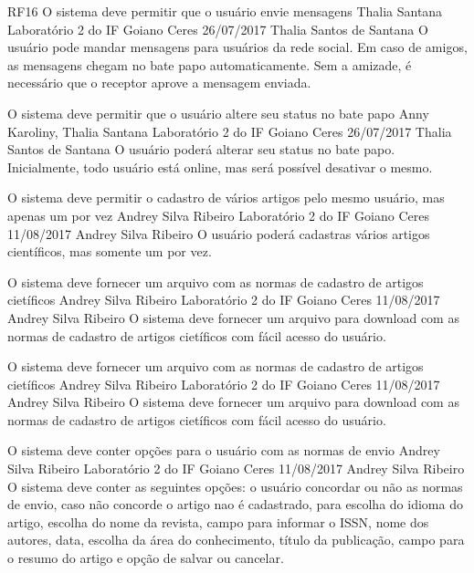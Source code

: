  \requisitoFuncional
 {RF16}
 {O sistema deve permitir que o  usuário envie mensagens}
 {Thalia Santana}
 {Laboratório 2 do IF Goiano Ceres}
 {26/07/2017}
 {Thalia Santos de Santana}
 {O usuário pode mandar mensagens para usuários da rede social. Em caso de amigos, as mensagens chegam no bate papo automaticamente. Sem a amizade, é necessário que o receptor aprove a mensagem enviada.
 }
 
 {O sistema deve permitir que o usuário altere seu status no bate papo}
 {Anny Karoliny, Thalia Santana}
 {Laboratório 2 do IF Goiano Ceres}
 {26/07/2017}
 {Thalia Santos de Santana}
 { O usuário poderá alterar seu status no bate papo. Inicialmente, todo usuário está online, mas será possível desativar o mesmo.
 }	
 
 {O sistema deve permitir o cadastro de vários artigos pelo mesmo usuário, mas apenas um por vez}
 {Andrey Silva Ribeiro}
 {Laboratório 2 do IF Goiano Ceres}
 {11/08/2017}
 {Andrey Silva Ribeiro}
 { O usuário poderá cadastras vários artigos científicos, mas somente um por vez.
 }
 
 {O sistema deve fornecer um arquivo com as normas de cadastro de artigos cietíficos}
 {Andrey Silva Ribeiro}
 {Laboratório 2 do IF Goiano Ceres}
 {11/08/2017}
 {Andrey Silva Ribeiro}
 { O sistema deve fornecer um arquivo para download com as normas de cadastro de artigos cietíficos com fácil acesso do usuário.
 }
 
 {O sistema deve fornecer um arquivo com as normas de cadastro de artigos cietíficos}
 {Andrey Silva Ribeiro}
 {Laboratório 2 do IF Goiano Ceres}
 {11/08/2017}
 {Andrey Silva Ribeiro}
 { O sistema deve fornecer um arquivo para download com as normas de cadastro de artigos cietíficos com fácil acesso do usuário.
 }
 
 {O sistema deve conter opções para o usuário com as normas de envio}
 {Andrey Silva Ribeiro}
 {Laboratório 2 do IF Goiano Ceres}
 {11/08/2017}
 {Andrey Silva Ribeiro}
 { O sistema deve conter as seguintes opções: o usuário concordar ou não as normas de envio, caso não concorde o artigo nao é cadastrado, para escolha do idioma do artigo, escolha do nome da revista, campo para informar o ISSN, nome dos autores, data, escolha da área do conhecimento, título da publicação, campo para o resumo do artigo e opção de salvar ou cancelar.
 }